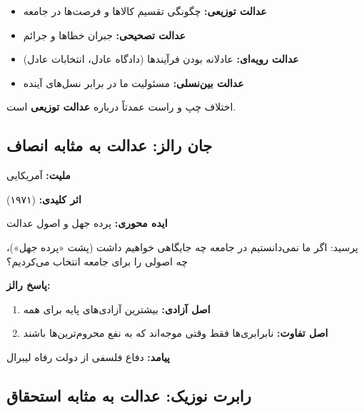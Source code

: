 \begin{defbox}
	\begin{itemize}[nosep]
		\item \textbf{عدالت توزیعی:} چگونگی تقسیم کالاها و فرصت‌ها در جامعه
		\item \textbf{عدالت تصحیحی:} جبران خطاها و جرائم
		\item \textbf{عدالت رویه‌ای:} عادلانه بودن فرآیندها (دادگاه عادل، انتخابات عادل)
		\item \textbf{عدالت بین‌نسلی:} مسئولیت ما در برابر نسل‌های آینده
	\end{itemize}
	اختلاف چپ و راست عمدتاً درباره \textbf{عدالت توزیعی} است.
\end{defbox}

\subsection{جان رالز: عدالت به مثابه انصاف}

\begin{personbox}
	
	\textbf{ملیت:} آمریکایی
	
	\textbf{اثر کلیدی:}  (۱۹۷۱)
	
	\textbf{ایده محوری:} پرده جهل و اصول عدالت
	
	\mediumspace
	
	 پرسید: اگر ما نمی‌دانستیم در جامعه چه جایگاهی خواهیم داشت (پشت «پرده جهل»)، چه اصولی را برای جامعه انتخاب می‌کردیم؟
	
	\textbf{پاسخ رالز:}
	\begin{enumerate}[nosep]
		\item \textbf{اصل آزادی:} بیشترین آزادی‌های پایه برای همه
		\item \textbf{اصل تفاوت:} نابرابری‌ها فقط وقتی موجه‌اند که به نفع محروم‌ترین‌ها باشند
	\end{enumerate}
	
	\mediumspace
	
	\textbf{پیامد:} دفاع فلسفی از دولت رفاه لیبرال
\end{personbox}

\subsection{رابرت نوزیک: عدالت به مثابه استحقاق}

